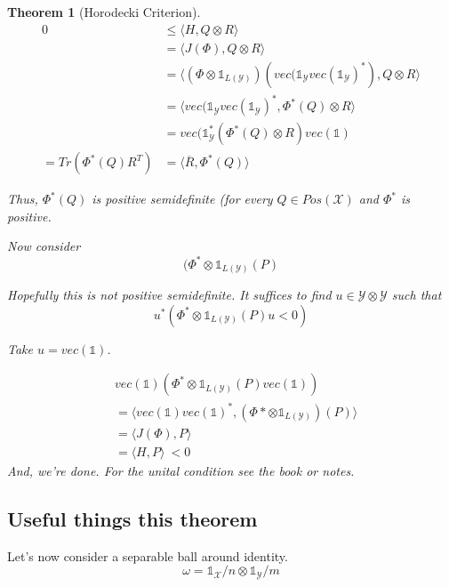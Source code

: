 \documentclass{article}
\newtheorem{theorem}{Theorem}
\begin{document}
\begin{theorem}[Horodecki Criterion]
    \begin{align*}
        0 & \le \langle H , Q \otimes R \rangle \\
          &= \langle J(\Phi) , Q \otimes R \rangle \\
          &= \langle \left( \Phi \otimes \mathds{1}_{L(\mathcal{Y})} \right)
        \left( vec(\mathds{1}_{\mathcal{Y}} vec(\mathds{1}_{\mathcal{Y}})^*
            \right) , Q \otimes R \rangle \\
            &= \langle vec(\mathds{1}_{\mathcal{Y}}
            vec(\mathds{1}_{\mathcal{Y}})^* , \Phi^*(Q) \otimes R \rangle  \\
            &= vec(\mathds{1}_{\mathcal{Y}}^* \left( \Phi^*(Q) \otimes R \right)
            vec(\mathds{1}) \\
            = Tr \left( \Phi^*(Q) R^T \right) &= \langle \overline{R} , \Phi^*(Q) \rangle 
    \end{align*}
    
    Thus, $\Phi^*(Q)$ is positive semidefinite (for every $Q \in
        Pos(\mathcal{X})$ and $\Phi^*$ is positive.

        Now consider
        \[ 
                (\Phi^* \otimes \mathds{1}_{L(\mathcal{Y})}(P) 
        \]
        
        Hopefully this is not positive semidefinite. It suffices to find $u \in
        \mathcal{Y} \otimes \mathcal{Y}$ such that 
        \[ 
                u^* \left( \Phi^* \otimes \mathds{1}_{L(\mathcal{Y})}(P) u < 0 \right) 
        \]

        Take $u = vec(\mathds{1})$.

        \begin{align*}
            &vec(\mathds{1}) \left( \Phi^* \otimes
            \mathds{1}_{L(\mathcal{Y})}(P) vec(\mathds{1}) \right) \\
            &= \langle vec(\mathds{1})vec(\mathds{1})^* , \left( \Phi* \otimes
        \mathds{1}_{L(\mathcal{Y})} \right)(P) \rangle \\
        &= \langle J(\Phi) , P \rangle \\
        &= \langle H , P \rangle \
        < 0
        \end{align*}
        And, we're done. For the unital condition see the book or notes.
\end{theorem}
        \subsection{Useful things this theorem}
        Let's now consider a separable ball around identity.
        \[ 
                \omega = \mathds{1}_{\mathcal{X}}/n \otimes
                \mathds{1}_{\mathcal{Y}}/m 
        \]
\end{document}
